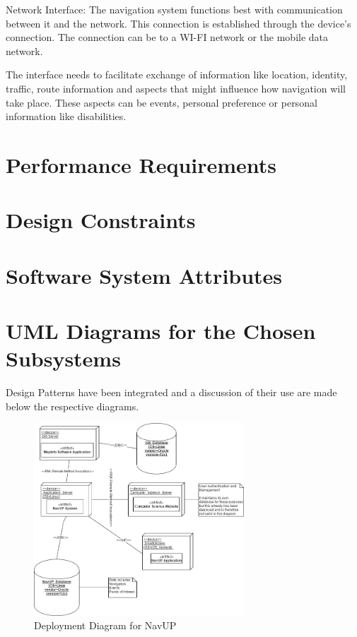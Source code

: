 \documentclass[runningheads,a4paper]{article}
\begin{document}
Network Interface:
The navigation system functions best with communication between it and the network. This connection is established through the device’s 
connection. The connection can be to a WI-FI network or the mobile data network. 

The interface needs to facilitate exchange of information like location, identity, traffic, route information and aspects that might 
influence how navigation will take place. These aspects can be events, personal preference or personal 
information like disabilities. 



\section{Performance Requirements}



\section{Design Constraints}



\section{Software System Attributes}



\section{UML Diagrams for the Chosen Subsystems}

Design Patterns have been integrated and a discussion of their use are made below the respective diagrams.


\begin{figure}[H]
   	\centering
   	\includegraphics[width=0.7\textwidth]{DeploymentDiagram.jpg}
   	\caption{Deployment Diagram for NavUP}
\end{figure}
\end{document}
